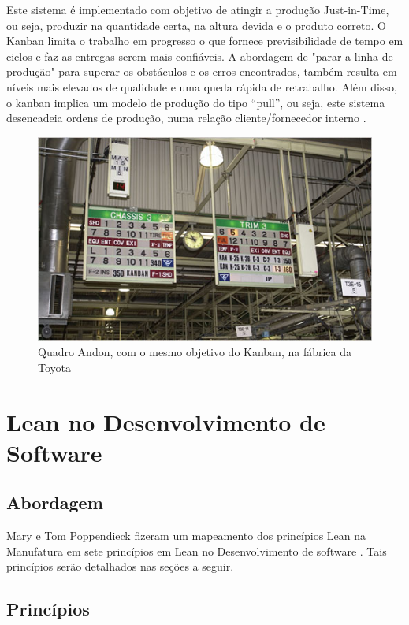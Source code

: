 Este sistema é implementado com objetivo de atingir a produção Just-in-Time, ou seja, produzir na quantidade certa, na altura devida e o produto correto. O Kanban limita o trabalho em progresso o que fornece previsibilidade de tempo em ciclos e faz as entregas serem mais confiáveis. A abordagem de "parar a linha de produção" para superar os obstáculos e os erros encontrados, também resulta em níveis mais elevados de qualidade e uma queda rápida de retrabalho. Além disso, o kanban implica um modelo de produção do tipo “pull”, ou seja, este sistema desencadeia ordens de produção, numa relação cliente/fornecedor interno \cite{rodrigues2012}.  

\begin{figure}[h]
		\centering
		\label{fig04}
			\includegraphics[scale=1.0]{figuras/kanbanindustria.png}
		\caption{Quadro Andon, com o mesmo objetivo do Kanban, na fábrica da Toyota \cite{kanbanindustria}}
\end{figure}

\section[Lean no Desenvolvimento de Software]{Lean no Desenvolvimento de Software}

\subsection[Abordagem]{Abordagem}

Mary e Tom Poppendieck fizeram um mapeamento dos princípios Lean na Manufatura em sete princípios em Lean no Desenvolvimento de software \cite{poppendieck}. Tais princípios serão detalhados nas seções a seguir. 

\subsection[Princípios]{Princípios}

